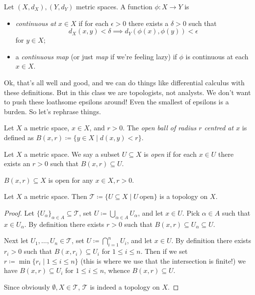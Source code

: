 \begin{definition}
  Let $(X, d_X), (Y, d_Y)$ metric spaces. A function $\phi : X \to Y$
  is
  \begin{itemize}
  \item \textit{continuous at} $x \in X$ if for each $\epsilon > 0$
    there exists a $\delta > 0$ such that
    \[
    d_X(x,y) < \delta \implies d_Y(\phi(x),\phi(y)) < \epsilon
    \]
    for $y \in X$;
  \item a \textit{continuous map} (or just \textit{map} if we're
    feeling lazy) if $\phi$ is continuous at each $x \in X$.
  \end{itemize}
\end{definition}

Ok, that's all well and good, and we can do things like differential
calculus with these definitions. But in this class we are topologists,
not analysts. We don't want to push these loathsome epsilons around!
Even the smallest of epsilons is a burden. So let's rephrase things.

\begin{definition}
  Let $X$ a metric space, $x \in X$, and $r > 0$. The \textit{open
    ball of radius $r$ centred at $x$} is defined as $B(x,r) \coloneqq
  \{y \in X \mid d(x,y) < r\}$.
\end{definition}

\begin{definition}
  Let $X$ a metric space. We say a subset $U \subseteq X$ is
  \emph{open} if for each $x \in U$ there exists an $r > 0$ such that
  $B(x,r) \subseteq U$.
\end{definition}

\begin{exercise}
  $B(x,r) \subseteq X$ is open for any $x \in X, r > 0$.
\end{exercise}

\begin{proposition}
  Let $X$ a metric space. Then $\mathcal{T} \coloneqq \{U \subseteq X
  \mid U\ \text{open}\}$ is a topology on $X$.
\end{proposition}

\begin{proof}
  Let $\{U_\alpha\}_{\alpha \in A} \subseteq \mathcal{T}$, set $U
  \coloneqq \bigcup_{\alpha \in A} U_\alpha$, and let $x \in U$. Pick
  $\alpha \in A$ such that $x \in U_\alpha$. By definition there
  exists $r > 0$ such that $B(x,r) \subseteq U_\alpha \subseteq U$.

  Next let $U_1,\ldots,U_n \in \mathcal{T}$, set $U \coloneqq
  \bigcap_{i=1}^n U_i$, and let $x \in U$. By definition there exists
  $r_i > 0$ such that $B(x,r_i) \subseteq U_i$ for $1 \le i \le
  n$. Then if we set $r \coloneqq \min \{r_i \mid 1 \le i \le n\}$
  (this is where we use that the intersection is finite!) we have
  $B(x,r) \subseteq U_i$ for $1 \le i \le n$, whence $B(x,r) \subseteq
  U$.

  Since obviously $\emptyset, X \in \mathcal{T}$, $\mathcal{T}$ is
  indeed a topology on $X$.
\end{proof}

